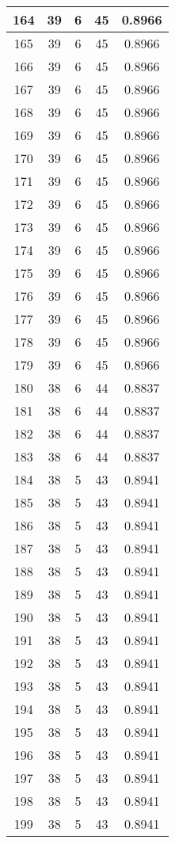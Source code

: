 \documentclass[letterpaper, 12pt]{article}
\begin{document}
\begin{longtable}{|c|c|c|c|c|}
\hline
164 & 39 & 6 & 45 & 0.8966 \\
\hline
165 & 39 & 6 & 45 & 0.8966 \\
\hline
166 & 39 & 6 & 45 & 0.8966 \\
\hline
167 & 39 & 6 & 45 & 0.8966 \\
\hline
168 & 39 & 6 & 45 & 0.8966 \\
\hline
169 & 39 & 6 & 45 & 0.8966 \\
\hline
170 & 39 & 6 & 45 & 0.8966 \\
\hline
171 & 39 & 6 & 45 & 0.8966 \\
\hline
172 & 39 & 6 & 45 & 0.8966 \\
\hline
173 & 39 & 6 & 45 & 0.8966 \\
\hline
174 & 39 & 6 & 45 & 0.8966 \\
\hline
175 & 39 & 6 & 45 & 0.8966 \\
\hline
176 & 39 & 6 & 45 & 0.8966 \\
\hline
177 & 39 & 6 & 45 & 0.8966 \\
\hline
178 & 39 & 6 & 45 & 0.8966 \\
\hline
179 & 39 & 6 & 45 & 0.8966 \\
\hline
180 & 38 & 6 & 44 & 0.8837 \\
\hline
181 & 38 & 6 & 44 & 0.8837 \\
\hline
182 & 38 & 6 & 44 & 0.8837 \\
\hline
183 & 38 & 6 & 44 & 0.8837 \\
\hline
184 & 38 & 5 & 43 & 0.8941 \\
\hline
185 & 38 & 5 & 43 & 0.8941 \\
\hline
186 & 38 & 5 & 43 & 0.8941 \\
\hline
187 & 38 & 5 & 43 & 0.8941 \\
\hline
188 & 38 & 5 & 43 & 0.8941 \\
\hline
189 & 38 & 5 & 43 & 0.8941 \\
\hline
190 & 38 & 5 & 43 & 0.8941 \\
\hline
191 & 38 & 5 & 43 & 0.8941 \\
\hline
192 & 38 & 5 & 43 & 0.8941 \\
\hline
193 & 38 & 5 & 43 & 0.8941 \\
\hline
194 & 38 & 5 & 43 & 0.8941 \\
\hline
195 & 38 & 5 & 43 & 0.8941 \\
\hline
196 & 38 & 5 & 43 & 0.8941 \\
\hline
197 & 38 & 5 & 43 & 0.8941 \\
\hline
198 & 38 & 5 & 43 & 0.8941 \\
\hline
199 & 38 & 5 & 43 & 0.8941 \\
\hline
\end{longtable}
\end{document}
